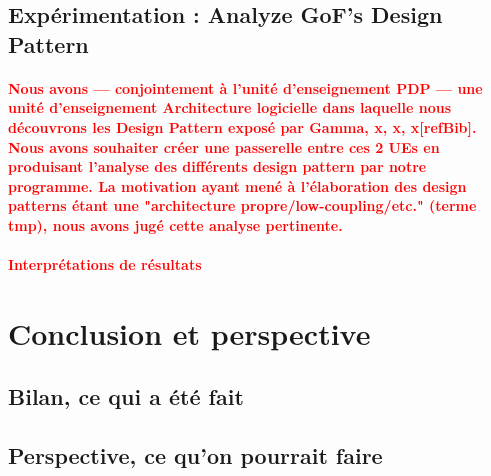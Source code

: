\documentclass{scrartcl}
\newcommand{\TODO}[1] {
    \noindent \paragraph{\textcolor{red}{#1}}
}
\begin{document}
    

    \subsection{Expérimentation : Analyze GoF's Design Pattern}
    \TODO{Nous avons --- conjointement à l'unité d'enseignement PDP --- une unité d'enseignement Architecture logicielle dans laquelle nous découvrons les Design Pattern exposé par Gamma, x, x, x[refBib]. Nous avons souhaiter créer une passerelle entre ces 2 UEs en produisant l'analyse des différents design pattern par notre programme. La motivation ayant mené à l'élaboration des design patterns étant une "architecture propre/low-coupling/etc." (terme tmp), nous avons jugé cette analyse pertinente.}
    
    \TODO{Interprétations de résultats}




\newpage
\section{Conclusion et perspective}
    \subsection{Bilan, ce qui a été fait}
    \subsection{Perspective, ce qu'on pourrait faire}



\pagebreak


\end{document}
